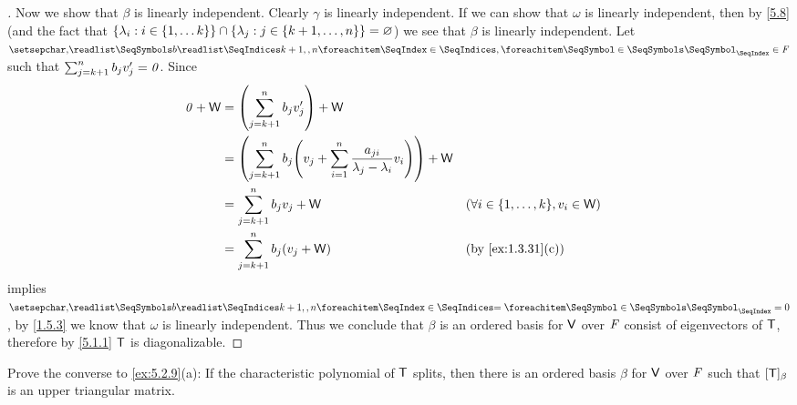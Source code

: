 \begin{proof}[]
  Now we show that \(\beta\) is linearly independent.
  Clearly \(\gamma\) is linearly independent.
  If we can show that \(\omega\) is linearly independent, then by \cref{5.8} (and the fact that \(\left\lbrace\lambda_i : i \in \left\lbrace1, \dots k\right\rbrace\right\rbrace \cap \left\lbrace\lambda_j : j \in \left\lbrace k + 1, \dots, n\right\rbrace\right\rbrace = \varnothing\)) we see that \(\beta\) is linearly independent.
  Let \(\seq{b}{k+1,,n} \in \F\) such that \(\sum_{j = k + 1}^n b_j v_j' = \mathit{0}\).
  Since
  \begin{align*}
    \zv + \W & = \pa{\sum_{j = k + 1}^n b_j v_j'} + \W                                                                                                                   \\
             & = \pa{\sum_{j = k + 1}^n b_j \pa{v_j + \sum_{i = 1}^n \frac{a_{j i}}{\lambda_j - \lambda_i} v_i}} + \W                                                    \\
             & = \sum_{j = k + 1}^n b_j v_j + \W                                                                      &  & (\forall i \in \set{1, \dots, k}, v_i \in \W) \\
             & = \sum_{j = k + 1}^n b_j (v_j + \W)                                                                    &  & \text{(by \cref{ex:1.3.31}(c))}
  \end{align*}
  implies \(\seq[=]{b}{k+1,,n} = 0\), by \cref{1.5.3} we know that \(\omega\) is linearly independent.
  Thus we conclude that \(\beta\) is an ordered basis for \(\mathsf{V}\) over \(\mathit{F}\) consist of eigenvectors of \(\mathsf{T}\), therefore by \cref{5.1.1} \(\mathsf{T}\) is diagonalizable.
\end{proof}

\begin{ex}\label{ex:5.4.32}
  Prove the converse to \cref{ex:5.2.9}(a):
  If the characteristic polynomial of \(\mathsf{T}\) splits, then there is an ordered basis \(\beta\) for \(\mathsf{V}\) over \(\mathit{F}\) such that \([\mathsf{T}]_{\beta}\) is an upper triangular matrix.
\end{ex}

